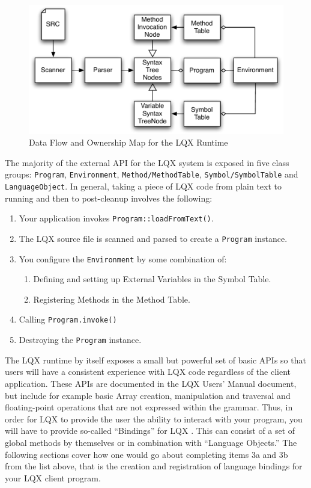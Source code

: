 \documentclass[]{article}
\newcommand{\ModLang}{LQX }
\begin{document}
  \begin{figure}[htbp]
    \centering
      \includegraphics[scale=0.7]{flowchart.pdf}
    \caption{Data Flow and Ownership Map for the LQX Runtime}
    \label{fig:flowchart}
  \end{figure}
  
  The majority of the external API for the \ModLang system is exposed in five class groups:
  {\tt Program}, {\tt Environment}, {\tt Method/MethodTable}, {\tt Symbol/SymbolTable} 
  and {\tt LanguageObject}. In general, taking a piece of \ModLang code from plain text to
  running and then to post-cleanup involves the following:
  
  \begin{enumerate}
    \item Your application invokes {\tt Program::loadFromText()}.
    \item The LQX source file is scanned and parsed to create a {\tt Program} instance.
    \item You configure the {\tt Environment} by some combination of:
      \begin{enumerate}
        \item Defining and setting up External Variables in the Symbol Table.
        \item Registering Methods in the Method Table.
      \end{enumerate}
    \item Calling {\tt Program.invoke()}
    \item Destroying the {\tt Program} instance.
  \end{enumerate}
  
  The LQX runtime by itself exposes a small but powerful set of basic APIs so that users
  will have a consistent experience with \ModLang code regardless of the client application.
  These APIs are documented in the \ModLang Users' Manual document, but include for example
  basic Array creation, manipulation and traversal and floating-point operations that
  are not expressed within the grammar. Thus, in order for \ModLang to provide the user
  the ability to interact with your program, you will have to provide so-called 
  ``Bindings'' for \ModLang. This can consist of a set of global methods by themselves
  or in combination with ``Language Objects.'' The following sections cover how one would
  go about completing items 3a and 3b from the list above, that is the creation and 
  registration of language bindings for your \ModLang client program.
  
\end{document}
